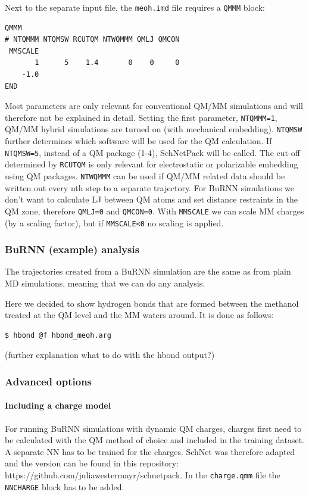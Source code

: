 Next to the separate input file, the \texttt{meoh.imd} file requires a \texttt{QMMM} block:
\begin{lstlisting}[breaklines=true, breakatwhitespace=false]
QMMM
# NTQMMM NTQMSW RCUTQM NTWQMMM QMLJ QMCON      
 MMSCALE
       1      5    1.4       0    0     0
    -1.0
END
\end{lstlisting}

Most parameters are only relevant for conventional QM/MM simulations and will therefore not be explained in detail.
Setting the first parameter, \texttt{NTQMMM=1}, QM/MM hybrid simulations are turned on (with mechanical embedding). \texttt{NTQMSW} further determines which software will be used for the QM calculation. If \texttt{NTQMSW=5}, instead of a QM package (1-4), SchNetPack will be called. The cut-off determined by \texttt{RCUTQM} is only relevant for electrostatic or polarizable embedding using QM packages. \texttt{NTWQMMM} can be used if QM/MM related data should be written out every nth step to a separate trajectory. For BuRNN simulations we don’t want to calculate LJ between QM atoms and set distance restraints in the QM zone, therefore \texttt{QMLJ=0} and \texttt{QMCON=0}. With \texttt{MMSCALE} we can scale MM charges (by a scaling factor), but if \texttt{MMSCALE<0} no scaling is applied.


\subsubsection{BuRNN (example) analysis}
The trajectories created from a BuRNN simulation are the same as from plain MD simulations, meaning that we can do any analysis.

Here we decided to show hydrogen bonds that are formed between the methanol treated at the QM level and the MM waters around. It is done as follows:

\begin{lstlisting}
$ hbond @f hbond_meoh.arg
\end{lstlisting}

(further explanation what to do with the hbond output?)

\subsubsection{Advanced options}
\paragraph{Including a charge model}
For running BuRNN simulations with dynamic QM charges, charges first need to be calculated with the QM method of choice and included in the training dataset. A separate NN has to be trained for the charges. SchNet was therefore adapted and the version can be found in this repository: https://github.com/juliawestermayr/schnetpack.
In the \texttt{charge.qmm} file the \texttt{NNCHARGE} block has to be added. 

